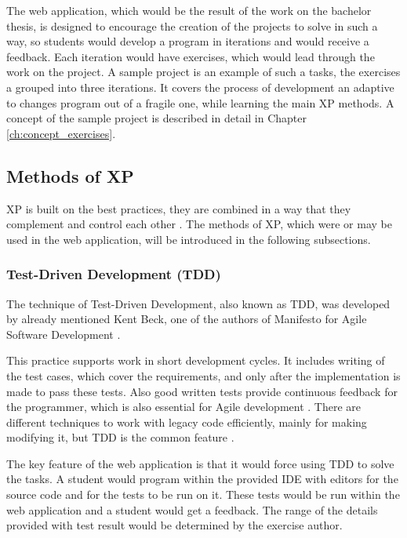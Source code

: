 The web application, which would be the result of the work on the bachelor thesis, is designed to encourage the creation of the projects to solve in such a way, so students would develop a program in iterations and would receive a feedback. Each iteration would have exercises, which would lead through the work on the project. A sample project is an example of such a tasks, the exercises a grouped into three iterations. It covers the process of development an adaptive to changes program out of a fragile one, while learning the main XP methods. A concept of the sample project is described in detail in Chapter \ref{ch:concept_exercises}.

\subsection{Methods of XP}

XP is built on the best practices, they are combined in a way that they complement and control each other \cite[Foreword]{xp_explained}. The methods of XP, which were or may be used in the web application, will be introduced in the following subsections.

\subsubsection{Test-Driven Development (TDD)}

The technique of Test-Driven Development, also known as TDD, was developed by already mentioned Kent Beck, one of the authors of Manifesto for Agile Software Development \cite{tdd_example}.

This practice supports work in short development cycles. It includes writing of the test cases, which cover the requirements, and only after the implementation is made to pass these tests. Also good written tests provide continuous feedback for the programmer, which is also essential for Agile development \cite{tdd_dp}. There are different techniques to work with legacy code efficiently, mainly for making modifying it, but TDD is the common feature \cite[Test-Driven Development (TDD)]{lc_effectively}.

The key feature of the web application is that it would force using TDD to solve the tasks. A student would program within the provided IDE with editors for the source code and for the tests to be run on it. These tests would be run within the web application and a student would get a feedback. The range of the details provided with test result would be determined by the exercise author. 

